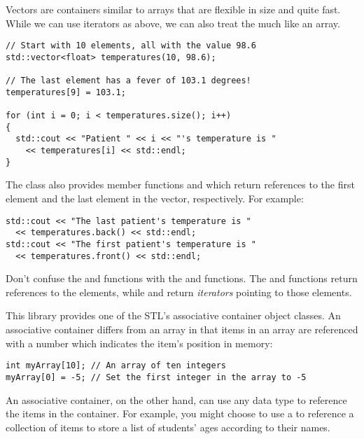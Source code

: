 
Vectors are containers similar to arrays that are flexible in size and quite fast. 
While we can use iterators as above, we can also treat the  much like an array.

\begin{lstlisting}
// Start with 10 elements, all with the value 98.6
std::vector<float> temperatures(10, 98.6); 

// The last element has a fever of 103.1 degrees!
temperatures[9] = 103.1; 

for (int i = 0; i < temperatures.size(); i++)
{
  std::cout << "Patient " << i << "'s temperature is " 
    << temperatures[i] << std::endl;
}
\end{lstlisting}

The  class also provides member functions  and  which return references to the first element and the last element in the vector, respectively.
For example:

\begin{lstlisting}
std::cout << "The last patient's temperature is " 
  << temperatures.back() << std::endl;
std::cout << "The first patient's temperature is " 
  << temperatures.front() << std::endl;
\end{lstlisting}

Don't confuse the  and  functions with the  and  functions. 
The  and  functions return references to the elements, while  and  return \emph{iterators} pointing to those elements.


This library provides one of the STL's associative container object classes. 
An associative container differs from an array in that items in an array are referenced with a number which indicates the item's position in memory:

\begin{lstlisting}
int myArray[10]; // An array of ten integers
myArray[0] = -5; // Set the first integer in the array to -5
\end{lstlisting}

An associative container, on the other hand, can use any data type to reference the items in the container. 
For example, you might choose to use a  to reference a collection of  items to store a list of students' ages according to their names.

